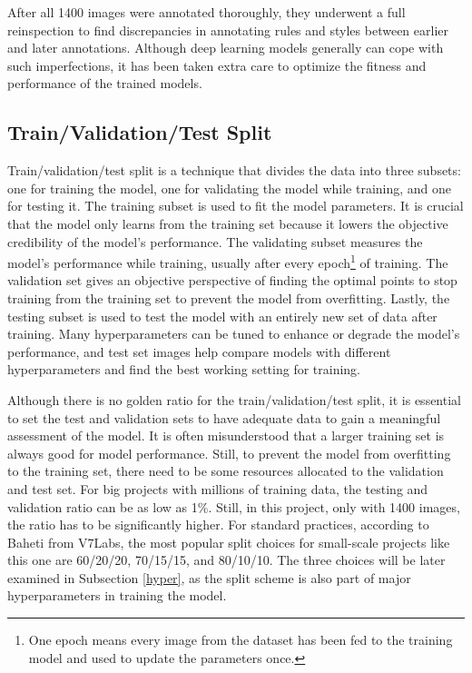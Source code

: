 After all 1400 images were annotated thoroughly, they underwent a full reinspection to find discrepancies in annotating rules and styles between earlier and later annotations. Although deep learning models generally can cope with such imperfections, it has been taken extra care to optimize the fitness and performance of the trained models.

\subsection{Train/Validation/Test Split}
Train/validation/test split is a technique that divides the data into three subsets: one for training the model, one for validating the model while training, and one for testing it. The training subset is used to fit the model parameters. It is crucial that the model only learns from the training set because it lowers the objective credibility of the model's performance. The validating subset measures the model's performance while training, usually after every epoch\footnote{One epoch means every image from the dataset has been fed to the training model and used to update the parameters once.} of training. The validation set gives an objective perspective of finding the optimal points to stop training from the training set to prevent the model from overfitting. Lastly, the testing subset is used to test the model with an entirely new set of data after training. Many hyperparameters can be tuned to enhance or degrade the model's performance, and test set images help compare models with different hyperparameters and find the best working setting for training. 

Although there is no golden ratio for the train/validation/test split, it is essential to set the test and validation sets to have adequate data to gain a meaningful assessment of the model. It is often misunderstood that a larger training set is always good for model performance. Still, to prevent the model from overfitting to the training set, there need to be some resources allocated to the validation and test set. For big projects with millions of training data, the testing and validation ratio can be as low as 1\%. Still, in this project, only with 1400 images, the ratio has to be significantly higher. For standard practices, according to Baheti from V7Labs, the most popular split choices for small-scale projects like this one are 60/20/20, 70/15/15, and 80/10/10. \cite{baheti} The three choices will be later examined in Subsection \ref{hyper}, as the split scheme is also part of major hyperparameters in training the model.

